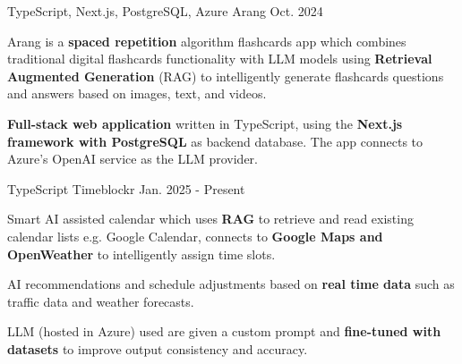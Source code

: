 
\begin{cventries}

  \cventry
    {TypeScript, Next.js, PostgreSQL, Azure} %
    {Arang} %
    {} %
    {Oct. 2024} %
    {
      \begin{cvitems} %
        \item {Arang is a \textbf{spaced repetition} algorithm flashcards app which combines traditional digital flashcards
functionality with LLM models using \textbf{Retrieval Augmented Generation} (RAG) to intelligently generate
flashcards questions and answers based on images, text, and videos.}
        \item {\textbf{Full-stack web application} written in TypeScript, using the \textbf{Next.js framework with PostgreSQL} as
backend database. The app connects to Azure's OpenAI service as the LLM provider.}
      \end{cvitems}
    }

  \cventry
    {TypeScript} %
    {Timeblockr} %
    {} %
    {Jan. 2025 - Present} %
    {
      \begin{cvitems} %
        \item {Smart AI assisted calendar which uses \textbf{RAG} to retrieve and read existing calendar lists e.g. Google Calendar, connects to \textbf{Google Maps and OpenWeather} to intelligently
assign time slots.}
        \item {AI recommendations and schedule adjustments based on \textbf{real time data} such as traffic data and weather
        forecasts.}
        \item {LLM (hosted in Azure) used are given a custom prompt and \textbf{fine-tuned with datasets} to improve output consistency and accuracy.}
      \end{cvitems}
    }

\end{cventries}
